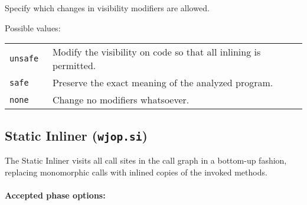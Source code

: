 \documentclass{article}
\begin{document}
\begin{description}
Specify which changes in visibility modifiers
are allowed.  




Possible values:\\
\begin{longtable}{p{1in}p{4in}}

{\tt unsafe }
&

Modify the visibility on code so that all inlining is permitted.
\\

{\tt safe }
&

Preserve the exact meaning of the analyzed program.
\\

{\tt none }
&

Change no modifiers whatsoever.
\\

\end{longtable}


\end{description}

\subsection{Static Inliner ({\tt wjop.si})}

The Static Inliner visits all call sites in the call graph in a
bottom-up fashion, replacing monomorphic calls with inlined
copies of the invoked methods.


\paragraph{Accepted phase options:} 
\end{document}
